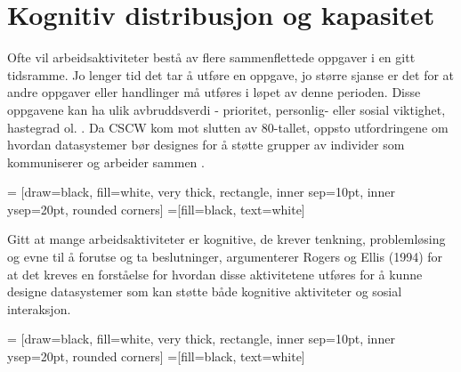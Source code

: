 \section{Kognitiv distribusjon og kapasitet}
\label{chp: kognisjon}

Ofte vil arbeidsaktiviteter bestå av flere sammenflettede oppgaver i en gitt tidsramme. Jo lenger tid det tar å utføre en oppgave, jo større sjanse er det for at andre oppgaver eller handlinger må utføres i løpet av denne perioden. Disse oppgavene kan ha ulik avbruddsverdi - prioritet, personlig- eller sosial viktighet, hastegrad ol. \cite{Rogers94}. 
Da CSCW kom mot slutten av 80-tallet, oppsto utfordringene om hvordan datasystemer bør designes for å støtte grupper av individer som kommuniserer og arbeider sammen \cite{Rogers94}. 

 = [draw=black, fill=white, very thick,
    rectangle, inner sep=10pt, inner ysep=20pt, rounded corners]
 =[fill=black, text=white]
%


\noindent
Gitt at mange arbeidsaktiviteter er kognitive, de krever tenkning, problemløsing og evne til å forutse og ta beslutninger, argumenterer Rogers og Ellis (1994) for at det kreves en forståelse for hvordan disse aktivitetene utføres for å kunne designe datasystemer som kan støtte både kognitive aktiviteter og sosial interaksjon.

 = [draw=black, fill=white, very thick,
    rectangle, inner sep=10pt, inner ysep=20pt, rounded corners]
 =[fill=black, text=white]
%

